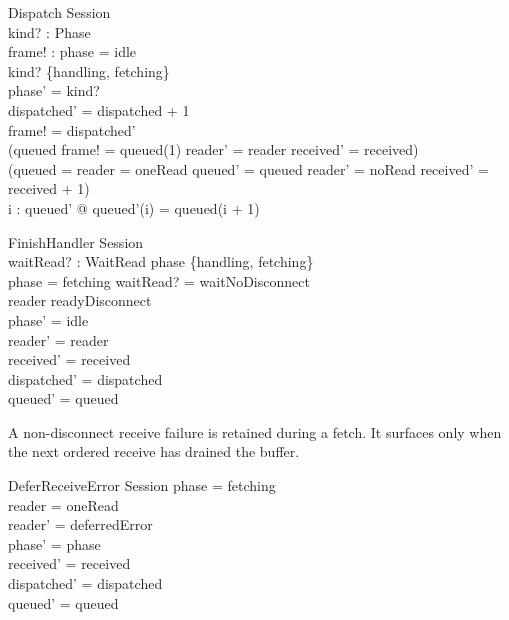 \documentclass[a4paper,10pt,fleqn]{article}
\begin{document}
\begin{schema}{Dispatch}
  \Delta Session \\
  kind? : Phase \\
  frame! : \nat
  \where
  phase = idle \\
  kind? \in \{handling, fetching\} \\
  phase' = kind? \\
  dispatched' = dispatched + 1 \\
  frame! = dispatched' \\
  (queued \neq \langle \rangle \land frame! = queued(1) \land
      reader' = reader \land received' = received) \\
  \quad \lor (queued = \langle \rangle \land reader = oneRead \land
      queued' = queued \land reader' = noRead \land
      received' = received + 1) \\
  \forall i : \dom queued' @ queued'(i) = queued(i + 1)
\end{schema}

\begin{schema}{FinishHandler}
  \Delta Session \\
  waitRead? : WaitRead
  \where
  phase \in \{handling, fetching\} \\
  phase = fetching \implies waitRead? = waitNoDisconnect \\
  reader \neq readyDisconnect \\
  phase' = idle \\
  reader' = reader \\
  received' = received \\
  dispatched' = dispatched \\
  queued' = queued
\end{schema}

A non-disconnect receive failure is retained during a fetch. It surfaces
only when the next ordered receive has drained the buffer.

\begin{schema}{DeferReceiveError}
  \Delta Session
  \where
  phase = fetching \\
  reader = oneRead \\
  reader' = deferredError \\
  phase' = phase \\
  received' = received \\
  dispatched' = dispatched \\
  queued' = queued
\end{schema}
\end{document}
